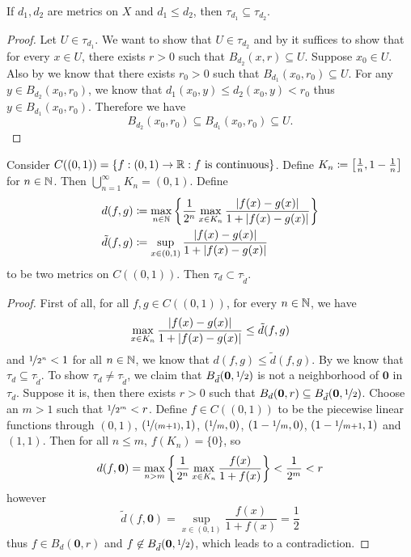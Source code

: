 \documentclass{techreport}
\begin{document}
\begin{lemma}\label{Lem:SmallerMetricIsWeaker}
	If $d_1,d_2$ are metrics on $X$ and $d_1 \le d_2$, then $\tau_{d_1} \subseteq \tau_{d_2}$.
\end{lemma}
\begin{proof}
	Let $U \in \tau_{d_1}$.
	We want to show that $U \in \tau_{d_2}$ and by  it suffices to show that for every $x \in U$, there exists $r >0$ such that $B_{d_2}(x,r) \subseteq U$.
	Suppose $x_0 \in U$.
	Also by  we know that there exists $r_0 > 0$ such that $B_{d_1}(x_0,r_0) \subseteq U$.
	For any $y \in B_{d_2}(x_0,r_0)$, we know that $d_1(x_0,y) \le d_2(x_0,y) < r_0$ thus $y \in B_{d_1}(x_0,r_0)$.
	Therefore we have
	\[
	B_{d_2}(x_0,r_0) \subseteq B_{d_1}(x_0,r_0) \subseteq U.
	\]
\end{proof}

\begin{proposition}\label{Prop:SmallerMetricIndeedWeaker}
	Consider $C((0,1)) = \{ f : (0,1) \to \mathbb{R} : f~\text{is continuous} \}$.
	Define $K_n \coloneqq \left[{\frac{1}{n}, 1-\frac{1}{n}}\right]$ for $n \in \mathbb{N}$.
	Then $\bigcup_{n=1}^\infty K_n = (0,1)$.
	Define
	\begin{align*}
		d(f,g) & \coloneqq \max_{n \in \mathbb{N}} \left\{ { \frac{1}{2^n} \max_{x \in K_n} \frac{\left|{f(x)-g(x)}\right|}{1+\left|{f(x)-g(x)}\right|} } \right\} \\
		\tilde{d}(f,g) & \coloneqq  \sup_{x \in (0,1)} \frac{\left|{f(x)-g(x)}\right|}{1+\left|{f(x)-g(x)}\right|}
	\end{align*}
	to be two metrics on $C((0,1))$.
	Then $\tau_d \subset \tau_{\tilde{d}}$.
\end{proposition}
\begin{proof}
	First of all, for all $f,g \in C((0,1))$, for every $n \in \mathbb{N}$, we have
	\[
	\max_{x \in K_n} \frac{\left|{f(x)-g(x)}\right|}{1+\left|{f(x)-g(x)}\right|} \le \tilde{d}(f,g)
	\]
	and $\nicefrac{1}{2^n} < 1$ for all $n \in \mathbb{N}$, we know that $d(f,g) \le \tilde{d}(f,g)$.
	By  we know that $\tau_d \subseteq \tau_{\tilde{d}}$.
	To show $\tau_d \neq \tau_{\tilde{d}}$, we claim that $B_{\tilde{d}}(\mathbf{0},\nicefrac{1}{2})$ is not a neighborhood of $\mathbf{0}$ in $\tau_d$.
	Suppose it is, then there exists $r > 0$ such that $B_d(\mathbf{0},r) \subseteq B_{\tilde{d}}(\mathbf{0},\nicefrac{1}{2})$.
	Choose an $m >1$ such that $\nicefrac{1}{2^m} < r$.
	Define $f \in C((0,1))$ to be the piecewise linear functions through $(0,1)$, $(\nicefrac{1}{(m+1)},1)$, $(\nicefrac{1}{m},0)$, $(1-\nicefrac{1}{m},0)$, $(1-\nicefrac{1}{m+1},1)$ and $(1,1)$.
	Then for all $n \le m$, $f(K_n) = \{0\}$, so
	\[
	d(f,\mathbf{0})  = \max_{n > m} \left\{ { \frac{1}{2^n} \max_{x \in K_n} \frac{f(x)}{1+f(x)}  } \right\} < \frac{1}{2^m} < r
	\]
	however
	\[
	\tilde{d}(f,\mathbf{0}) = \sup_{x \in (0,1)} \frac{f(x)}{1+f(x)} = \frac{1}{2}
	\]
	thus $f \in B_d(\mathbf{0},r)$ and $f \not\in B_{\tilde{d}}(\mathbf{0}, \nicefrac{1}{2})$, which leads to a contradiction.
\end{proof}
\end{document}
